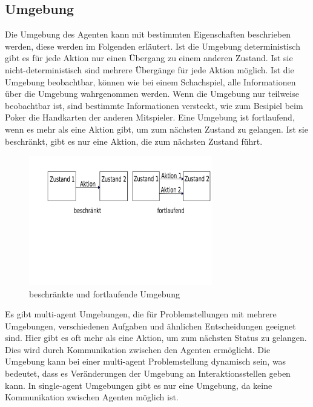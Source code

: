	\subsection{Umgebung}
	Die Umgebung des Agenten kann mit bestimmten Eigenschaften beschrieben werden, diese werden im Folgenden erläutert. \cite{Nandy2018} \newline
	Ist die Umgebung deterministisch gibt es für jede Aktion nur einen Übergang zu einem anderen Zustand. Ist sie nicht-deterministisch sind mehrere Übergänge für jede Aktion möglich. \cite{Nandy2018}\newline
	Ist die Umgebung beobachtbar, können wie bei einem Schachspiel, alle Informationen über die Umgebung wahrgenommen werden. Wenn die Umgebung nur teilweise beobachtbar ist, sind bestimmte Informationen versteckt, wie zum Besipiel beim Poker die Handkarten der anderen Mitspieler. \cite{Nandy2018}\newline
	Eine Umgebung ist fortlaufend, wenn es mehr als eine Aktion gibt, um zum nächsten Zustand zu gelangen. Ist sie beschränkt, gibt es nur eine Aktion, die zum nächsten Zustand führt. \cite{Nandy2018}
	\begin{figure}[h!]
		\centering
		\includegraphics[width=8cm]{Bilder/Umgebung.pdf}
		\caption{beschränkte und fortlaufende Umgebung}
		\label{fig:abb7}
	\end{figure} \newline
	Es gibt multi-agent Umgebungen, die für Problemstellungen mit mehrere Umgebungen, verschiedenen Aufgaben und ähnlichen Entscheidungen geeignet sind. Hier gibt es oft mehr als eine Aktion, um zum nächsten Status zu gelangen. Dies wird durch Kommunikation zwischen den Agenten ermöglicht. Die Umgebung kann bei einer multi-agent Problemstellung dynamisch sein, was bedeutet, dass es Veränderungen der Umgebung an Interaktionsstellen geben kann. In single-agent Umgebungen gibt es nur eine Umgebung, da keine Kommunikation zwischen Agenten möglich ist. \cite{Nandy2018}
